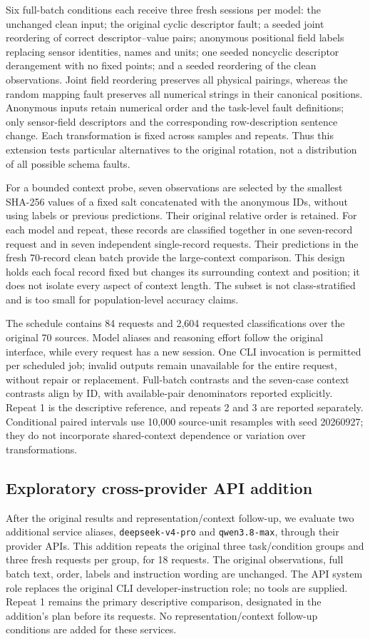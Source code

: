 \documentclass[11pt,a4paper]{article}
\begin{document}
Six full-batch conditions each receive three fresh sessions per model: the unchanged clean input; the original cyclic descriptor fault; a seeded joint reordering of correct descriptor--value pairs; anonymous positional field labels replacing sensor identities, names and units; one seeded noncyclic descriptor derangement with no fixed points; and a seeded reordering of the clean observations. Joint field reordering preserves all physical pairings, whereas the random mapping fault preserves all numerical strings in their canonical positions. Anonymous inputs retain numerical order and the task-level fault definitions; only sensor-field descriptors and the corresponding row-description sentence change. Each transformation is fixed across samples and repeats. Thus this extension tests particular alternatives to the original rotation, not a distribution of all possible schema faults.

For a bounded context probe, seven observations are selected by the smallest SHA-256 values of a fixed salt concatenated with the anonymous IDs, without using labels or previous predictions. Their original relative order is retained. For each model and repeat, these records are classified together in one seven-record request and in seven independent single-record requests. Their predictions in the fresh 70-record clean batch provide the large-context comparison. This design holds each focal record fixed but changes its surrounding context and position; it does not isolate every aspect of context length. The subset is not class-stratified and is too small for population-level accuracy claims.

The schedule contains 84 requests and 2,604 requested classifications over the original 70 sources. Model aliases and reasoning effort follow the original interface, while every request has a new session. One CLI invocation is permitted per scheduled job; invalid outputs remain unavailable for the entire request, without repair or replacement. Full-batch contrasts and the seven-case context contrasts align by ID, with available-pair denominators reported explicitly. Repeat 1 is the descriptive reference, and repeats 2 and 3 are reported separately. Conditional paired intervals use 10,000 source-unit resamples with seed 20260927; they do not incorporate shared-context dependence or variation over transformations.


\subsection{Exploratory cross-provider API addition}
After the original results and representation/context follow-up, we evaluate two additional service aliases, \texttt{deepseek-v4-pro} and \texttt{qwen3.8-max}, through their provider APIs. This addition repeats the original three task/condition groups and three fresh requests per group, for 18 requests. The original observations, full batch text, order, labels and instruction wording are unchanged. The API system role replaces the original CLI developer-instruction role; no tools are supplied. Repeat 1 remains the primary descriptive comparison, designated in the addition's plan before its requests. No representation/context follow-up conditions are added for these services.
\end{document}
